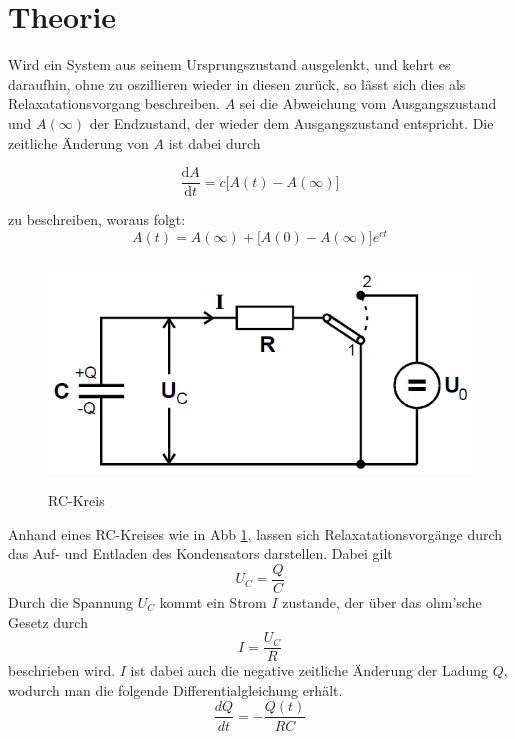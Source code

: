 \section{Theorie}
\label{sec:Theorie}

Wird ein System aus seinem Ursprungszustand ausgelenkt, und kehrt es daraufhin, ohne zu oszillieren 
wieder in diesen zurück, so lässt sich dies als Relaxatationsvorgang beschreiben.
$A$ sei die Abweichung vom Ausgangszustand und $A(\infty)$ der Endzustand, der wieder dem Ausgangszustand
entspricht. Die zeitliche Änderung von $A$ ist dabei durch

\begin{equation}
    \label{eqn:dA}
    \frac{\text{d}A}{\text{d}t} = c\biggl[ A(t) - A(\infty) \biggr]
\end{equation}

zu beschreiben, woraus folgt: 
\begin{equation}
    \label{eqn:avont}
    A(t) = A(\infty) + \bigl[A(0) - A(\infty)]e^{ct}
\end{equation}

\FloatBarrier
\begin{figure}
    \centering
    \includegraphics[height=6cm]{data/bild_1}
    \caption{RC-Kreis}
    \label{fig:bild_1}
\end{figure}
Anhand eines RC-Kreises wie in Abb \ref{fig:bild_1}, lassen sich Relaxatationsvorgänge durch das Auf- und Entladen des Kondensators
darstellen. Dabei gilt 
\begin{equation}
    U_C = \frac{Q}C   
\end{equation}
Durch die Spannung $U_C$ kommt ein Strom $I$ zustande, der über das ohm'sche Gesetz durch
\begin{equation}
    I = \frac{U_C}R 
\end{equation}
beschrieben wird. $I$ ist dabei auch die negative zeitliche Änderung der Ladung $Q$, wodurch man die folgende 
Differentialgleichung erhält.
\begin{equation}
    \frac{dQ}{dt} = -\frac{Q(t)}{RC}    
\end{equation}

